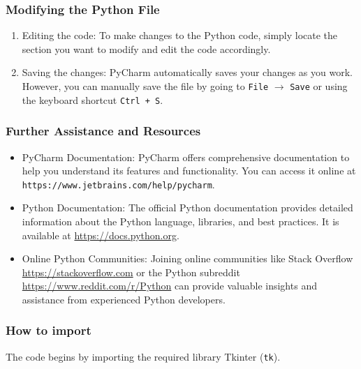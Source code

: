 \subsubsection{Modifying the Python File}

\begin{enumerate}
    
    \item Editing the code: To make changes to the Python code, simply locate the section you want to modify and edit the code accordingly.
    
    \item Saving the changes: PyCharm automatically saves your changes as you work. However, you can manually save the file by going to \texttt{File} $\rightarrow$ \texttt{Save} or using the keyboard shortcut \texttt{Ctrl + S}.
    
\end{enumerate}

\subsubsection{Further Assistance and Resources}

\begin{itemize}
    
    \item PyCharm Documentation: PyCharm offers comprehensive documentation to help you understand its features and functionality. You can access it online at \texttt{https://www.jetbrains.com/help/pycharm}.
    
    \item Python Documentation: The official Python documentation provides detailed information about the Python language, libraries, and best practices. It is available at \url{https://docs.python.org}.
    
    \item Online Python Communities: Joining online communities like Stack Overflow \url{https://stackoverflow.com} or the Python subreddit \url{https://www.reddit.com/r/Python} can provide valuable insights and assistance from experienced Python developers.
    
\end{itemize}


\subsubsection{How to import}
The code begins by importing the required library Tkinter (\texttt{tk}).


